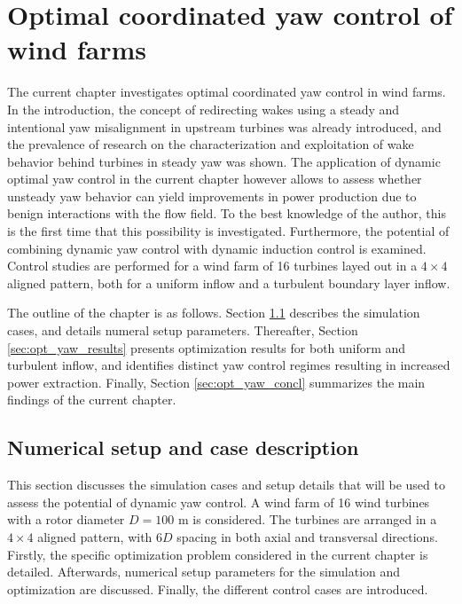 \chapter{Optimal coordinated yaw control of wind farms}\label{ch:opt_yaw}

\def\mystrut{\rule{0pt}{1.1\normalbaselineskip}}

The current chapter investigates optimal coordinated yaw control in wind farms. In the introduction, the concept of redirecting wakes using a steady and intentional yaw misalignment in upstream turbines was already introduced, and the prevalence of research on the characterization and exploitation of wake behavior behind turbines in steady yaw was shown. The application of dynamic optimal yaw control in the current chapter however allows to assess whether unsteady yaw behavior can yield improvements in power production due to benign interactions with the flow field. To the best knowledge of the author, this is the first time that this possibility is investigated. Furthermore, the potential of combining dynamic yaw control with dynamic induction control is examined. Control studies are performed for a wind farm of 16 turbines layed out in a $4 \times 4$ aligned pattern, both for a uniform inflow and a turbulent boundary layer inflow. 

The outline of the chapter is as follows. Section \ref{sec:opt_yaw_setup} describes the simulation cases, and details numeral setup parameters. Thereafter, Section \ref{sec:opt_yaw_results} presents optimization results for both uniform and turbulent inflow, and identifies distinct yaw control regimes resulting in increased power extraction. Finally, Section \ref{sec:opt_yaw_concl} summarizes the main findings of the current chapter. 


\section{Numerical setup and case description}\label{sec:opt_yaw_setup}
This section discusses the simulation cases and setup details that will be used to assess the potential of dynamic yaw control. A wind farm of 16 wind turbines with a rotor diameter $D = 100$ m is considered. The turbines are arranged in a $4 \times 4$ aligned pattern, with $6D$ spacing in both axial and transversal directions. Firstly, the specific optimization problem considered in the current chapter is detailed. Afterwards, numerical setup parameters for the simulation and optimization are discussed. Finally, the different control cases are introduced. 

